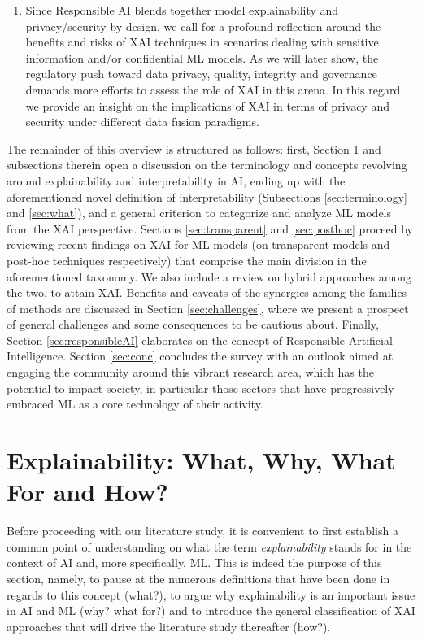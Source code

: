 \documentclass[final]{elsarticle}
\begin{document}
\begin{enumerate}[leftmargin=*]
\item Since Responsible AI blends together model explainability and privacy/security by design, we call for a profound reflection around the benefits and risks of XAI techniques in scenarios dealing with sensitive information and/or confidential ML models. As we will later show, the regulatory push toward data privacy, quality, integrity and governance demands more efforts to assess the role of XAI in this arena. In this regard, we provide an insight on the implications of XAI in terms of privacy and security under different data fusion paradigms.
\end{enumerate}

The remainder of this overview is structured as follows: first, Section \ref{sec:xaiwwwh} and subsections therein open a discussion on the terminology and concepts revolving around explainability and interpretability in AI, ending up with the aforementioned novel definition of interpretability (Subsections \ref{sec:terminology} and \ref{sec:what}), and a general criterion to categorize and analyze ML models from the XAI perspective. Sections \ref{sec:transparent} and \ref{sec:posthoc} proceed by reviewing recent findings on XAI for ML models (on transparent models and post-hoc techniques respectively) that comprise the main division in the aforementioned taxonomy. We also include a review on hybrid approaches among the two, to attain XAI. Benefits and caveats of the synergies among the families of methods are discussed in Section \ref{sec:challenges}, where we present a prospect of general challenges and some consequences to be cautious about. Finally, Section \ref{sec:responsibleAI} elaborates on the concept of Responsible Artificial Intelligence. Section \ref{sec:conc} concludes the survey with an outlook aimed at engaging the community around this vibrant research area, which has the potential to impact society, in particular those sectors that have progressively embraced ML as a core technology of their activity.

\section{Explainability: What, Why, What For and How?} \label{sec:xaiwwwh}

Before proceeding with our literature study, it is convenient to first establish a common point of understanding on what the term \emph{explainability} stands for in the context of AI and, more specifically, ML. This is indeed the purpose of this section, namely, to pause at the numerous definitions that have been done in regards to this concept (what?), to argue why explainability is an important issue in AI and ML (why? what for?) and to introduce the general classification of XAI approaches that will drive the literature study thereafter (how?).
\end{document}
